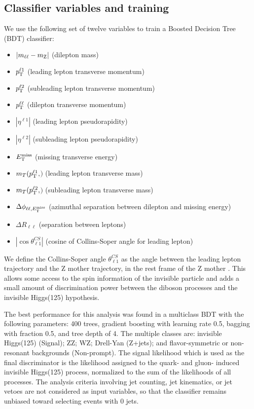 \subsection{Classifier variables and training} 

We use the following set of twelve variables to train a Boosted Decision Tree (BDT) classifier: 
\begin{itemize}
\item  $\left|m_{\ell\ell}-m_{\mathrm{Z}}\right|$ (dilepton mass) 
\item $p_{\mathrm{T}}^{\ell 1}$ (leading lepton transverse momentum) 
\item $p_{\mathrm{T}}^{\ell 2}$ (subleading lepton transverse momentum)
\item $p_{\mathrm{T}}^{\ell\ell}$ (dilepton transverse momentum)
\item $| \eta^{\ell 1} |$ (leading lepton pseudorapidity)
\item $| \eta^{\ell 2} |$ (subleading lepton pseudorapidity)
\item $E_\mathrm{T}^{\mathrm{miss}}$       (missing transverse energy)
\item $m_{T}(p_{\mathrm{T}}^{\ell 1}, $\met$)$ (leading lepton transverse mass)
\item $m_{T}(p_{\mathrm{T}}^{\ell 2}, $\met$)$ (subleading lepton transverse mass)
\item $\Delta \phi_{\ell\ell,E_\mathrm{T}^{\mathrm{miss}}}$ (azimuthal separation between dilepton and missing energy) 
\item $\Delta R_{\ell\ell}$ (separation between leptons)
\item $| \cos \theta^{CS}_{\ell1} |$ (cosine of Collins-Soper angle for leading lepton)
\end{itemize}

We define the Collins-Soper angle $\theta^{CS}_{\ell1}$ as the angle between the leading lepton trajectory and the Z mother trajectory, in the rest frame of the Z mother \cite{Collins:1984kg}.
This allows some access to the spin information of the invisible particle and adds a small amount of discrimination power between the diboson processes and the invisible Higgs(125) hypothesis.

The best performance for this analysis was found in a multiclass BDT with the following parameters: 400 trees, gradient boosting with learning rate 0.5, bagging with fraction 0.5, and tree depth of 4.
The multiple classes are: invisible Higgs(125) (Signal); ZZ; WZ; Drell-Yan (Z+jets); and flavor-symmetric or non-resonant backgrounds (Non-prompt).
The signal likelihood which is used as the final discriminator is the likelihood assigned to the quark- and gluon- induced invisible Higgs(125) process, normalized to the sum of the likelihoods of all processes.
The analysis criteria involving jet counting, jet kinematics, or jet vetoes are not considered as input variables, so that the classifier remains unbiased toward selecting events with 0 jets.

